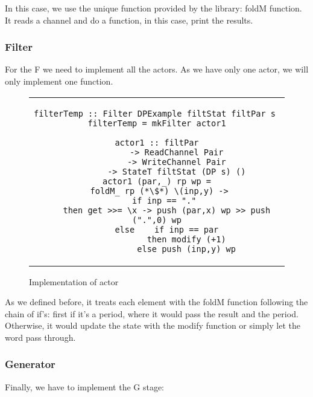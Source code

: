 In this case, we use the unique function provided by the library: foldM function.
It reads a channel and do a function, in this case, print the results.

\subsubsection*{Filter}
For the F we need to implement all the actors.
As we have only one actor, we will only implement one function.

\begin{figure}[H]
    \begin{tabular}{c}
        \begin{lstlisting}
filterTemp :: Filter DPExample filtStat filtPar s 
filterTemp = mkFilter actor1

actor1 :: filtPar
        -> ReadChannel Pair
        -> WriteChannel Pair
        -> StateT filtStat (DP s) ()
actor1 (par,_) rp wp =
  foldM_ rp (*\$*) \(inp,y) -> 
    if inp == "." 
    then get >>= \x -> push (par,x) wp >> push (".",0) wp
    else    if inp == par
            then modify (+1)
            else push (inp,y) wp
        \end{lstlisting}
    \end{tabular}
    \caption[{[Code]} Implementation 4]{Implementation of actor}
    \label{fig:HC19}
\end{figure}

As we defined before, it treats each element with the foldM function following the chain of if's: first if it's a period, where it would pass the result and the period.
Otherwise, it would update the state with the modify function or simply let the word pass through.

\subsubsection*{Generator}
Finally, we have to implement the G stage:

